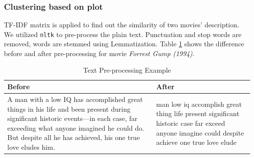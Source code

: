 \documentclass[journal]{IEEEtran}
\theoremstyle{mydefstyle}
\begin{document}
\subsubsection{Clustering based on plot} TF-IDF matrix is applied to find out the similarity of two movies' description. We utilized \texttt{nltk} to pre-process the plain text. Punctuation and stop words are removed, words are stemmed using Lemmatization. Table \ref{tab:preprocess} shows the difference before and after pre-processing for movie \textit{Forrest Gump (1994)}.


\begin{table}[h]
\centering
\caption{Text Pre-processing Example}
\label{tab:preprocess}
\begin{tabular}{|>{\centering\arraybackslash}m{3.5cm}|>{\centering\arraybackslash}m{3.5cm}|}
\hline
\textbf{Before} & \textbf{After} \\
\hline
A man with a low IQ has accomplished great things in his life and been present during significant historic events—in each case, far exceeding what anyone imagined he could do. But despite all he has achieved, his one true love eludes him. & man low iq accomplish great thing life present significant historic case far exceed anyone imagine could despite achieve one true love elude \\
\hline
\end{tabular}
\end{table}

\end{document}
